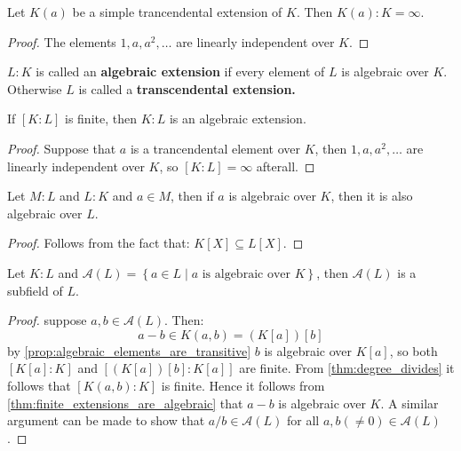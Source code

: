 \begin{theorem}
Let $K(a)$ be a simple trancendental extension of $K$. Then $K(a) : K = \infty$.
\end{theorem}
\begin{proof}
The elements $1, a, a^2, \ldots$ are linearly independent over $K$.
\end{proof}

\begin{definition}
$L : K$ is called an \textbf{algebraic extension} if every element of $L$ is algebraic over $K$. Otherwise $L$ is called a \textbf{transcendental extension.}
\end{definition}

\begin{theorem}\label{thm:finite_extensions_are_algebraic}
If $[K : L]$ is finite, then $K : L$ is an algebraic extension.
\end{theorem}
\begin{proof}
Suppose that $a$ is a trancendental element over $K$, then $1, a, a^2, \ldots$ are linearly independent over $K$, so $[K : L] = \infty$ afterall.
\end{proof}

\begin{proposition}\label{prop:algebraic_elements_are_transitive}
  Let $M : L$ and $L : K$ and $a \in M$, then if $a$ is algebraic over $K$, then it is also algebraic over $L$.
\end{proposition}
\begin{proof}
Follows from the fact that: $K[X] \subseteq L[X]$.
\end{proof}

\begin{theorem}\label{thm:algebraic_elements_form_a_subfield}
Let $K : L$ and $\mathcal{A}(L) = \left\{a \in L \middle| a \text{ is algebraic over } K \right\}$, then $\mathcal{A}(L)$ is a subfield of $L$.
\end{theorem}
\begin{proof}
  suppose $a, b \in \mathcal{A}(L)$. Then:
  \begin{equation*}
    a - b \in K(a, b) = (K[a])[b]
  \end{equation*}
  by \autoref{prop:algebraic_elements_are_transitive} $b$ is algebraic over $K[a]$, so both $[K[a] : K]$ and $[(K[a])[b] : K[a]]$ are finite. From \autoref{thm:degree_divides} it follows that $[K(a, b) : K] $ is finite. Hence it follows from \autoref{thm:finite_extensions_are_algebraic} that $a - b$ is algebraic over $K$. A similar argument can be made to show that $a / b \in \mathcal{A}(L)$ for all $a, b (\neq 0) \in \mathcal{A}(L)$.
\end{proof}

